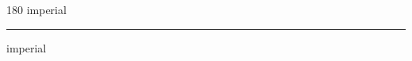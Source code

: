 
\begin{frame}
\begin{center}
\begin{turn}{180}
{\fontsize{2.5cm}{1em}\selectfont imperial}
\end{turn}
\vspace{1em}\par  
\hrule
\vspace{1em}\par  
{\fontsize{2.5cm}{1em}\selectfont imperial}
\end{center}
\end{frame}
